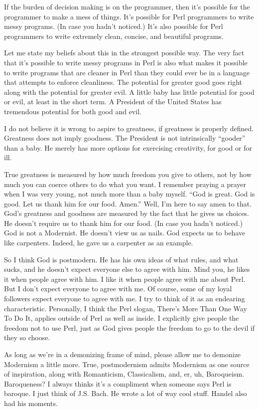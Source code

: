 \documentclass[10pt,letterpaper]{article}
\begin{document}
If the burden of decision making is on the programmer, then it's possible for
the programmer to make a mess of things. It's possible for Perl programmers
to write messy programs. (In case you hadn't noticed.) It's also possible for
Perl programmers to write extremely clean, concise, and beautiful programs.

Let me state my beliefs about this in the strongest possible way. The very
fact that it's possible to write messy programs in Perl is also what makes it
possible to write programs that are cleaner in Perl than they could ever be
in a language that attempts to enforce cleanliness. The potential for greater
good goes right along with the potential for greater evil. A little baby has
little potential for good or evil, at least in the short term. A President of
the United States has tremendous potential for both good and evil.

I do not believe it is wrong to aspire to greatness, if greatness is properly
defined. Greatness does not imply goodness. The President is not intrinsically
``gooder'' than a baby. He merely has more options for exercising
creativity, for good or for ill.

True greatness is measured by how much freedom you give to others, not by how
much you can coerce others to do what you want. I remember praying a prayer
when I was very young, not much more than a baby myself. ``God is great. God
is good. Let us thank him for our food. Amen.'' Well, I'm here to say amen
to that. God's greatness and goodness are measured by the fact that he gives
us choices. He doesn't require us to thank him for our food. (In case you
hadn't noticed.) God is not a Modernist. He doesn't view us as nails. God
expects us to behave like carpenters. Indeed, he gave us a carpenter as an
example.

So I think God is postmodern. He has his own ideas of what rules, and what
sucks, and he doesn't expect everyone else to agree with him. Mind you, he
likes it when people agree with him. I like it when people agree with me
about Perl. But I don't expect everyone to agree with me. Of course, some of
my loyal followers expect everyone to agree with me. I try to think of it as
an endearing characteristic. Personally, I think the Perl slogan, There's
More Than One Way To Do It, applies outside of Perl as well as inside. I
explicitly give people the freedom not to use Perl, just as God gives people
the freedom to go to the devil if they so choose.

As long as we're in a demonizing frame of mind, please allow me to demonize
Modernism a little more. True, postmodernism admits Modernism as one source
of inspiration, along with Romanticism, Classicalism, and, er, uh,
Baroqueism. Baroqueness? I always thinks it's a compliment when someone says
Perl is baroque. I just think of J.S. Bach. He wrote a lot of way cool stuff.
Handel also had his moments.
\end{document}
